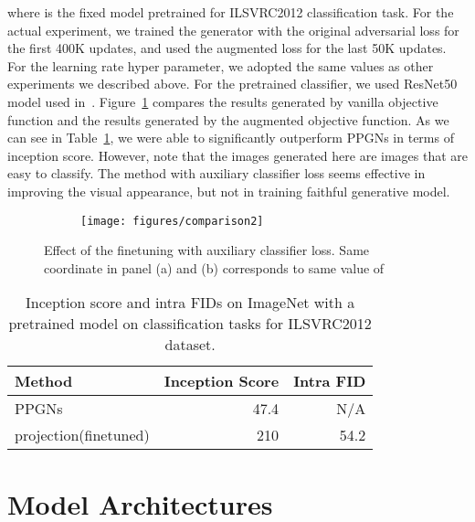 \documentclass{article}
\begin{document}
where  is the fixed model pretrained for ILSVRC2012 classification task.
For the actual experiment, we trained the generator with the original adversarial loss for the first 400K  updates, and used the augmented loss for the last 50K updates.  For the learning rate hyper parameter, we adopted the same values as other experiments we described above. For the pretrained classifier, we used ResNet50 model used in~\cite{he2016deep}. Figure~\ref{fig:comparison2} compares the results generated by vanilla objective function and the results generated by the augmented objective function. 
As we can see in Table~\ref{tab:scores_imagenet_pretrained}, we were able to significantly outperform PPGNs in terms of inception score.
However, note that the images generated here are images that are easy to classify.  The method with auxiliary classifier loss seems effective in improving the visual appearance, but not in training faithful generative model.

\begin{figure}[t]
	\centering
    \begin{subfigure}{0.8\textwidth}
	    \texttt{[image: figures/comparison2]}
    \end{subfigure}
    \caption{\label{fig:comparison2}
    Effect of the finetuning with auxiliary classifier loss.  
    Same coordinate in panel (a) and (b) corresponds to same value of }
\end{figure}

\begin{table}[t]
\centering
\caption{Inception score and intra FIDs on ImageNet with a pretrained model on classification tasks for ILSVRC2012 dataset.
 \cite{nguyen2017plug} }\label{tab:scores_imagenet_pretrained}
\begin{tabular}[t]{lrr}
\toprule
Method & Inception Score & Intra FID \\
\midrule
PPGNs\textsuperscript{} & 47.4 & N/A \\
projection(finetuned) & 210 & 54.2 \\
\bottomrule
\end{tabular}
\end{table}

\clearpage
\section{\label{apd:exp_settings}Model Architectures}
\end{document}
